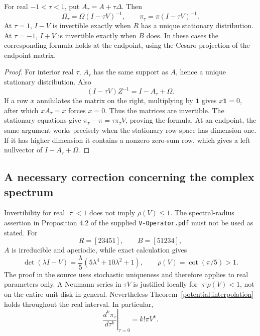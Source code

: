 \begin{theorem}\label{potential:interpolation}

For real $-1<\tau<1$, put $A_\tau=A+\tau\Delta$. Then
\[
 \Omega_\tau=\Omega(I-\tau V)^{-1},\qquad
 \pi_\tau=\pi(I-\tau V)^{-1}.
\]
At $\tau=1$, $I-V$ is invertible exactly when $R$ has a unique stationary
distribution. At $\tau=-1$, $I+V$ is invertible exactly when $B$ does.
In these cases the corresponding formula holds at the endpoint, using
the Cesaro projection of the endpoint matrix.
\end{theorem}
\begin{proof}
For interior real $\tau$, $A_\tau$ has the same support as $A$, hence a
unique stationary distribution. Also
\[
 (I-\tau V)Z^{-1}=I-A_\tau+\Omega.
\]
If a row $x$ annihilates the matrix on the right, multiplying by
$\mathbf1$ gives $x\mathbf1=0$, after which $xA_\tau=x$ forces $x=0$.
Thus the matrices are invertible. The stationary equations give
$\pi_\tau-\pi=\tau\pi_\tau V$, proving the formula.
At an endpoint, the same argument works precisely when the stationary
row space has dimension one. If it has higher dimension it contains a
nonzero zero-sum row, which gives a left nullvector of $I-A_\tau+\Omega$.
\end{proof}

\subsection{A necessary correction concerning the complex spectrum}
Invertibility for real $|\tau|<1$ does not imply $\rho(V)\le1$.
The spectral-radius assertion in Proposition 4.2 of the supplied
\texttt{V-Operator.pdf} must not be used as stated. For
\[
 R=[23451],\qquad B=[51234],
\]
$A$ is irreducible and aperiodic, while exact calculation gives
\[
 \det(\lambda I-V)=\frac{\lambda}{5}
 (5\lambda^4+10\lambda^2+1),\qquad
 \rho(V)=\cot(\pi/5)>1.
\]
The proof in the source uses stochastic uniqueness and therefore applies
to real parameters only. A Neumann series in $\tau V$ is justified locally
for $|\tau|\rho(V)<1$, not on the entire unit disk in general.
Nevertheless Theorem~\ref{potential:interpolation} holds throughout the
real interval. In particular,
\[
 \left.\frac{d^k\pi_\tau}{d\tau^k}\right|_{\tau=0}=k!\pi V^k.
\]

